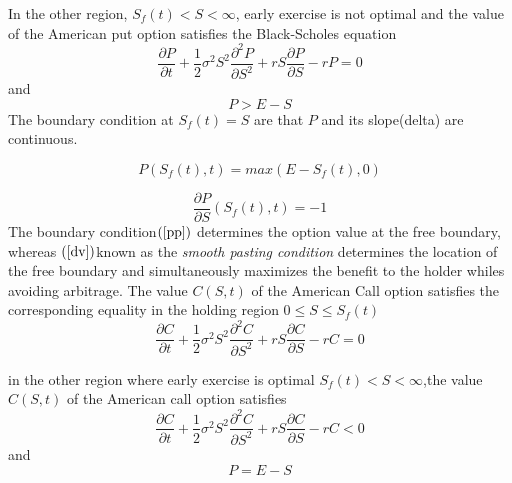 \documentclass[12pt]{article}
\numberwithin{equation}{subsection} %
\begin{document}
In the other region, $S_{f}(t)< S<\infty$, early exercise is not
optimal and the value of the American put option satisfies the
Black-Scholes equation
 \begin{equation}
\frac{\partial P}{\partial t}+\frac{1}{2}\sigma^2S^2\frac{\partial^2
P}{\partial S^2} +rS\frac{\partial P}{\partial S}-rP= 0
 \end{equation}
 and
  \begin{equation}
P>E-S
 \end{equation}
 The boundary condition at $S_{f}(t)= S$ are that $P$ and its
 slope(delta) are continuous.

 \begin{equation}\label{pp}
P(S_{f}(t),t)=max(E-S_{f}(t),0)
 \end{equation}

\begin{equation}\label{dv}
 \frac{\partial P}{\partial S}(S_{f}(t),t)=-1
 \end{equation}
  The boundary condition$( \ref{pp})$ determines the option value at the
  free boundary, whereas $(\ref{dv})$known as the \textit{smooth pasting condition} determines the location of the
  free boundary and simultaneously maximizes the benefit to the
  holder whiles avoiding arbitrage.
  The value $C(S,t)$ of the American Call  option satisfies the
  corresponding equality in the holding region
 $0\leq S\leq S_{f}(t)$
 \begin{equation}
\frac{\partial C}{\partial t}+\frac{1}{2}\sigma^2S^2\frac{\partial^2
C}{\partial S^2} +rS\frac{\partial C}{\partial S}-rC=0
 \end{equation}

in the other region where early exercise is optimal $S_{f}(t)<
S<\infty$,the value $C(S,t)$ of the American call option satisfies
 \begin{equation}
\frac{\partial C}{\partial t}+\frac{1}{2}\sigma^2S^2\frac{\partial^2
C}{\partial S^2} +rS\frac{\partial C}{\partial S}-rC<0
 \end{equation}
 and
 \begin{equation}
P=E-S
 \end{equation}
\end{document}
